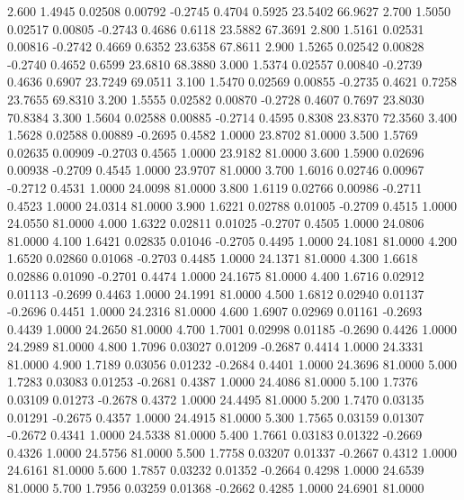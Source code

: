    2.600   1.4945   0.02508   0.00792  -0.2745   0.4704   0.5925  23.5402  66.9627
   2.700   1.5050   0.02517   0.00805  -0.2743   0.4686   0.6118  23.5882  67.3691
   2.800   1.5161   0.02531   0.00816  -0.2742   0.4669   0.6352  23.6358  67.8611
   2.900   1.5265   0.02542   0.00828  -0.2740   0.4652   0.6599  23.6810  68.3880
   3.000   1.5374   0.02557   0.00840  -0.2739   0.4636   0.6907  23.7249  69.0511
   3.100   1.5470   0.02569   0.00855  -0.2735   0.4621   0.7258  23.7655  69.8310
   3.200   1.5555   0.02582   0.00870  -0.2728   0.4607   0.7697  23.8030  70.8384
   3.300   1.5604   0.02588   0.00885  -0.2714   0.4595   0.8308  23.8370  72.3560
   3.400   1.5628   0.02588   0.00889  -0.2695   0.4582   1.0000  23.8702  81.0000
   3.500   1.5769   0.02635   0.00909  -0.2703   0.4565   1.0000  23.9182  81.0000
   3.600   1.5900   0.02696   0.00938  -0.2709   0.4545   1.0000  23.9707  81.0000
   3.700   1.6016   0.02746   0.00967  -0.2712   0.4531   1.0000  24.0098  81.0000
   3.800   1.6119   0.02766   0.00986  -0.2711   0.4523   1.0000  24.0314  81.0000
   3.900   1.6221   0.02788   0.01005  -0.2709   0.4515   1.0000  24.0550  81.0000
   4.000   1.6322   0.02811   0.01025  -0.2707   0.4505   1.0000  24.0806  81.0000
   4.100   1.6421   0.02835   0.01046  -0.2705   0.4495   1.0000  24.1081  81.0000
   4.200   1.6520   0.02860   0.01068  -0.2703   0.4485   1.0000  24.1371  81.0000
   4.300   1.6618   0.02886   0.01090  -0.2701   0.4474   1.0000  24.1675  81.0000
   4.400   1.6716   0.02912   0.01113  -0.2699   0.4463   1.0000  24.1991  81.0000
   4.500   1.6812   0.02940   0.01137  -0.2696   0.4451   1.0000  24.2316  81.0000
   4.600   1.6907   0.02969   0.01161  -0.2693   0.4439   1.0000  24.2650  81.0000
   4.700   1.7001   0.02998   0.01185  -0.2690   0.4426   1.0000  24.2989  81.0000
   4.800   1.7096   0.03027   0.01209  -0.2687   0.4414   1.0000  24.3331  81.0000
   4.900   1.7189   0.03056   0.01232  -0.2684   0.4401   1.0000  24.3696  81.0000
   5.000   1.7283   0.03083   0.01253  -0.2681   0.4387   1.0000  24.4086  81.0000
   5.100   1.7376   0.03109   0.01273  -0.2678   0.4372   1.0000  24.4495  81.0000
   5.200   1.7470   0.03135   0.01291  -0.2675   0.4357   1.0000  24.4915  81.0000
   5.300   1.7565   0.03159   0.01307  -0.2672   0.4341   1.0000  24.5338  81.0000
   5.400   1.7661   0.03183   0.01322  -0.2669   0.4326   1.0000  24.5756  81.0000
   5.500   1.7758   0.03207   0.01337  -0.2667   0.4312   1.0000  24.6161  81.0000
   5.600   1.7857   0.03232   0.01352  -0.2664   0.4298   1.0000  24.6539  81.0000
   5.700   1.7956   0.03259   0.01368  -0.2662   0.4285   1.0000  24.6901  81.0000
